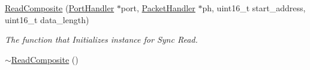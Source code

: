 \begin{DoxyCompactItemize}
\item 
\hyperlink{classmercury_1_1_read_composite_ad42cd08c6d5d656b96a3721c91844054}{Read\+Composite} (\hyperlink{classmercury_1_1_port_handler}{Port\+Handler} $\ast$port, \hyperlink{classmercury_1_1_packet_handler}{Packet\+Handler} $\ast$ph, uint16\+\_\+t start\+\_\+address, uint16\+\_\+t data\+\_\+length)
\begin{DoxyCompactList}\small\item\em The function that Initializes instance for Sync Read. \end{DoxyCompactList}\item 
\hyperlink{classmercury_1_1_read_composite_a748222385f9725ba93130408985e834b}{$\sim$\+Read\+Composite} ()\hypertarget{classmercury_1_1_read_composite_a748222385f9725ba93130408985e834b}{}\label{classmercury_1_1_read_composite_a748222385f9725ba93130408985e834b}


\end{DoxyCompactItemize}
